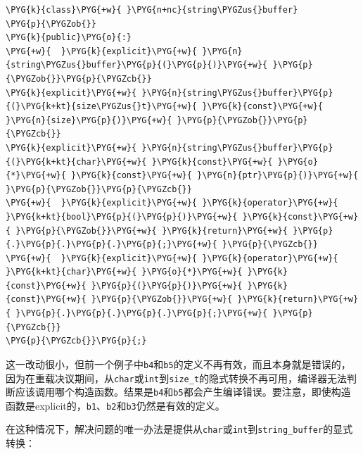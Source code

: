 \begin{codeblockbg}
\begin{Verbatim}[commandchars=\\\{\},breaklines=true,breakanywhere=true,fontsize=\codefont,xleftmargin=17bp]
\PYG{k}{class}\PYG{+w}{ }\PYG{n+nc}{string\PYGZus{}buffer}
\PYG{p}{\PYGZob{}}
\PYG{k}{public}\PYG{o}{:}
\PYG{+w}{  }\PYG{k}{explicit}\PYG{+w}{ }\PYG{n}{string\PYGZus{}buffer}\PYG{p}{(}\PYG{p}{)}\PYG{+w}{ }\PYG{p}{\PYGZob{}}\PYG{p}{\PYGZcb{}}
\PYG{k}{explicit}\PYG{+w}{ }\PYG{n}{string\PYGZus{}buffer}\PYG{p}{(}\PYG{k+kt}{size\PYGZus{}t}\PYG{+w}{ }\PYG{k}{const}\PYG{+w}{ }\PYG{n}{size}\PYG{p}{)}\PYG{+w}{ }\PYG{p}{\PYGZob{}}\PYG{p}{\PYGZcb{}}
\PYG{k}{explicit}\PYG{+w}{ }\PYG{n}{string\PYGZus{}buffer}\PYG{p}{(}\PYG{k+kt}{char}\PYG{+w}{ }\PYG{k}{const}\PYG{+w}{ }\PYG{o}{*}\PYG{+w}{ }\PYG{k}{const}\PYG{+w}{ }\PYG{n}{ptr}\PYG{p}{)}\PYG{+w}{ }\PYG{p}{\PYGZob{}}\PYG{p}{\PYGZcb{}}
\PYG{+w}{  }\PYG{k}{explicit}\PYG{+w}{ }\PYG{k}{operator}\PYG{+w}{ }\PYG{k+kt}{bool}\PYG{p}{(}\PYG{p}{)}\PYG{+w}{ }\PYG{k}{const}\PYG{+w}{ }\PYG{p}{\PYGZob{}}\PYG{+w}{ }\PYG{k}{return}\PYG{+w}{ }\PYG{p}{.}\PYG{p}{.}\PYG{p}{.}\PYG{p}{;}\PYG{+w}{ }\PYG{p}{\PYGZcb{}}
\PYG{+w}{  }\PYG{k}{explicit}\PYG{+w}{ }\PYG{k}{operator}\PYG{+w}{ }\PYG{k+kt}{char}\PYG{+w}{ }\PYG{o}{*}\PYG{+w}{ }\PYG{k}{const}\PYG{+w}{ }\PYG{p}{(}\PYG{p}{)}\PYG{+w}{ }\PYG{k}{const}\PYG{+w}{ }\PYG{p}{\PYGZob{}}\PYG{+w}{ }\PYG{k}{return}\PYG{+w}{ }\PYG{p}{.}\PYG{p}{.}\PYG{p}{.}\PYG{p}{;}\PYG{+w}{ }\PYG{p}{\PYGZcb{}}
\PYG{p}{\PYGZcb{}}\PYG{p}{;}
\end{Verbatim}
\end{codeblockbg}



这一改动很小，但前一个例子中\texttt{b4}和\texttt{b5}的定义不再有效，而且本身就是错误的，因为在重载决议期间，从\texttt{char}或\texttt{int}到\texttt{size\_\allowbreak{}t}的隐式转换不再可用，编译器无法判断应该调用哪个构造函数。结果是\texttt{b4}和\texttt{b5}都会产生编译错误。要注意，即使构造函数是explicit的，\texttt{b1}、\texttt{b2}和\texttt{b3}仍然是有效的定义。



在这种情况下，解决问题的唯一办法是提供从\texttt{char}或\texttt{int}到\texttt{string\_\allowbreak{}buffer}的显式转换：



